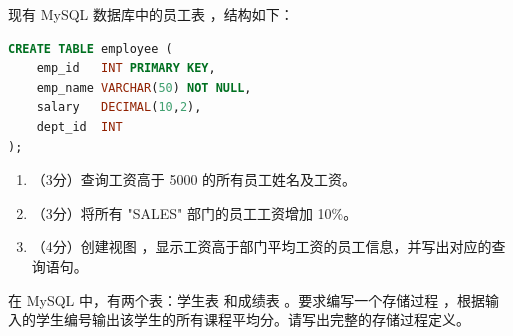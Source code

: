 \documentclass[a4paper,11pt]{article}
\begin{document}
\q 现有 MySQL 数据库中的员工表 ，结构如下：
\begin{lstlisting}[language=SQL]
CREATE TABLE employee (
    emp_id   INT PRIMARY KEY,
    emp_name VARCHAR(50) NOT NULL,
    salary   DECIMAL(10,2),
    dept_id  INT
);
\end{lstlisting}
\begin{enumerate}[leftmargin=2em, itemsep=3pt]
  \item[（1）] （3分）查询工资高于 5000 的所有员工姓名及工资。
  \item[（2）] （3分）将所有 "SALES" 部门的员工工资增加 10\%。
  \item[（3）] （4分）创建视图 ，显示工资高于部门平均工资的员工信息，并写出对应的查询语句。
\end{enumerate}
\anslines{3cm}

\q 在 MySQL 中，有两个表：学生表  和成绩表 。要求编写一个存储过程 ，根据输入的学生编号输出该学生的所有课程平均分。请写出完整的存储过程定义。

\anslines{4cm}
\end{document}
